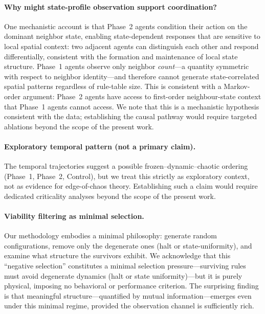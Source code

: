 \documentclass[letterpaper]{article}
\begin{document}
\paragraph{Why might state-profile observation support coordination?}
One mechanistic account is that Phase~2 agents condition their action on the dominant neighbor state, enabling state-dependent responses that are sensitive to local spatial context: two adjacent agents can distinguish each other and respond differentially, consistent with the formation and maintenance of local state structure. Phase~1 agents observe only neighbor \emph{count}---a quantity symmetric with respect to neighbor identity---and therefore cannot generate state-correlated spatial patterns regardless of rule-table size. This is consistent with a Markov-order argument: Phase~2 agents have access to first-order neighbour-state context that Phase~1 agents cannot access. We note that this is a mechanistic hypothesis consistent with the data; establishing the causal pathway would require targeted ablations beyond the scope of the present work.

\paragraph{Exploratory temporal pattern (not a primary claim).}
The temporal trajectories suggest a possible frozen--dynamic--chaotic ordering
(Phase~1, Phase~2, Control), but we treat this strictly as exploratory context,
not as evidence for edge-of-chaos theory. Establishing such a claim would
require dedicated criticality analyses beyond the scope of the present work.

\paragraph{Viability filtering as minimal selection.}
Our methodology embodies a minimal philosophy: generate random configurations,
remove only the degenerate ones (halt or state-uniformity), and examine what structure the survivors
exhibit. We acknowledge that this ``negative selection'' constitutes a minimal
selection pressure---surviving rules must avoid degenerate dynamics (halt or
state uniformity)---but it is purely physical, imposing no behavioral or
performance criterion. The surprising finding is that meaningful
structure---quantified by mutual information---emerges even under this minimal
regime, provided the observation channel is sufficiently rich.
\end{document}
